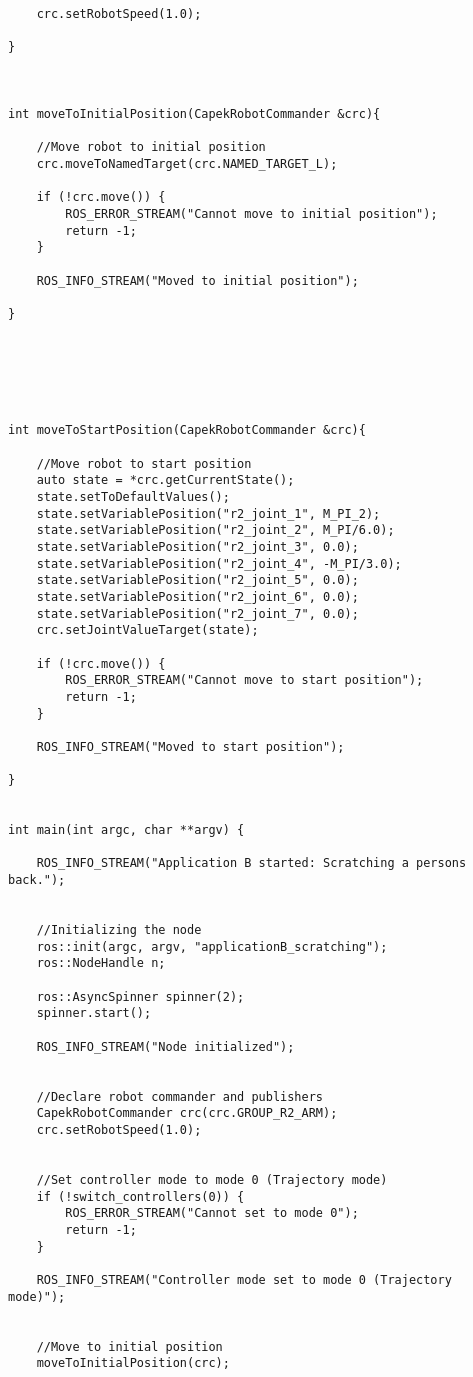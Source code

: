 \begin{lstlisting}
	crc.setRobotSpeed(1.0);

}



int moveToInitialPosition(CapekRobotCommander &crc){

	//Move robot to initial position
	crc.moveToNamedTarget(crc.NAMED_TARGET_L);

	if (!crc.move()) {
		ROS_ERROR_STREAM("Cannot move to initial position");
		return -1;
	}

	ROS_INFO_STREAM("Moved to initial position");

}






int moveToStartPosition(CapekRobotCommander &crc){

	//Move robot to start position
	auto state = *crc.getCurrentState();
	state.setToDefaultValues();
	state.setVariablePosition("r2_joint_1", M_PI_2);
	state.setVariablePosition("r2_joint_2", M_PI/6.0);
	state.setVariablePosition("r2_joint_3", 0.0);
	state.setVariablePosition("r2_joint_4", -M_PI/3.0);
	state.setVariablePosition("r2_joint_5", 0.0);
	state.setVariablePosition("r2_joint_6", 0.0);
	state.setVariablePosition("r2_joint_7", 0.0);
	crc.setJointValueTarget(state);

	if (!crc.move()) {
		ROS_ERROR_STREAM("Cannot move to start position");
		return -1;
	}

	ROS_INFO_STREAM("Moved to start position");

}


int main(int argc, char **argv) {

	ROS_INFO_STREAM("Application B started: Scratching a persons back.");


	//Initializing the node
	ros::init(argc, argv, "applicationB_scratching");
	ros::NodeHandle n;

	ros::AsyncSpinner spinner(2);
	spinner.start();

	ROS_INFO_STREAM("Node initialized");


	//Declare robot commander and publishers
	CapekRobotCommander crc(crc.GROUP_R2_ARM);
	crc.setRobotSpeed(1.0);
		

	//Set controller mode to mode 0 (Trajectory mode)
	if (!switch_controllers(0)) {
		ROS_ERROR_STREAM("Cannot set to mode 0");
		return -1;
	}

	ROS_INFO_STREAM("Controller mode set to mode 0 (Trajectory mode)");


	//Move to initial position
	moveToInitialPosition(crc);


\end{lstlisting}
